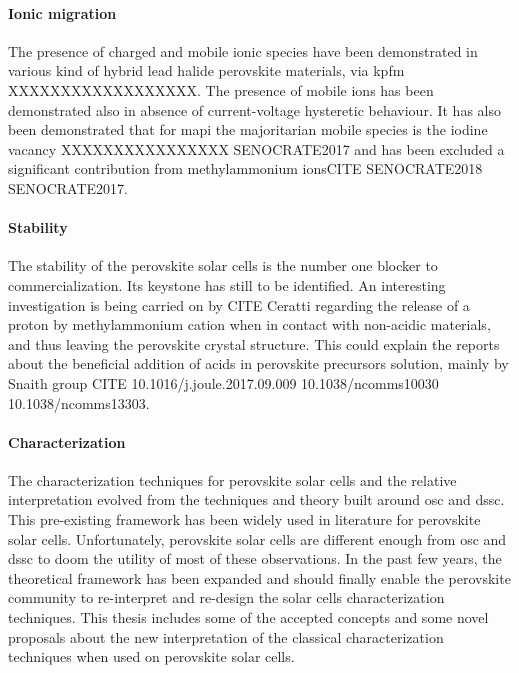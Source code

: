 \paragraph{Ionic migration}

The presence of charged and mobile ionic species have been demonstrated in various kind of hybrid lead halide perovskite materials, via \gls{kpfm}\cite{Birkhold2018} XXXXXXXXXXXXXXXXXX. The presence of mobile ions has been demonstrated also in absence of current-voltage hysteretic behaviour\cite{Calado2016,Jacobs2018}. It has also been demonstrated that for \gls{mapi} the majoritarian mobile species is the iodine vacancy XXXXXXXXXXXXXXXX SENOCRATE2017 and has been excluded a significant contribution from methylammonium ionsCITE SENOCRATE2018 SENOCRATE2017.

\paragraph{Stability}
The stability of the perovskite solar cells is the number one blocker to commercialization. Its keystone has still to be identified. An interesting investigation is being carried on by CITE Ceratti regarding the release of a proton by methylammonium cation when in contact with non-acidic materials, and thus leaving the perovskite crystal structure. This could explain the reports about the beneficial addition of acids in perovskite precursors solution, mainly by Snaith group CITE 10.1016/j.joule.2017.09.009 10.1038/ncomms10030 10.1038/ncomms13303.

\paragraph{Characterization}

The characterization techniques for perovskite solar cells and the relative interpretation evolved from the techniques and theory built around \gls{osc} and \gls{dssc}. This pre-existing framework has been widely used in literature for perovskite solar cells. Unfortunately, perovskite solar cells are different enough from \gls{osc} and \gls{dssc} to doom the utility of most of these observations. In the past few years, the theoretical framework has been expanded and should finally enable the perovskite community to re-interpret and re-design the solar cells characterization techniques. This thesis includes some of the accepted concepts and some novel proposals about the new interpretation of the classical characterization techniques when used on perovskite solar cells.

